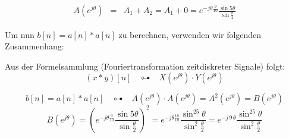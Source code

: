 \begin{uebsp}
\begin{Answer}
\begin{enumerate}[a)]
            \begin{eqnarray*}
                A\left(e^{j\theta}\right)&=&A_1+A_2=A_1+0=e^{-j\theta\frac{9}{10}}\frac{
    \sin5\theta}{\sin\frac{\theta}{2}}
            \end{eqnarray*}

            Um nun $b[n]=a[n]*a[n]$ zu berechnen, verwenden wir folgenden
            Zusammenhang:
            \begin{uebsp_theory}
                Aus der Formelsammlung (Fouriertransformation zeitdiskreter
                Signale) folgt:
                \[(x*y)[n]\;\;\;\multimapdotbothA\;\;\;X\left(e^{j\theta}\right)\cdot
                Y\left(e^{j\theta}\right)\]
            \end{uebsp_theory}
            \[b[n]=a[n]*a[n]\;\;\;\multimapdotbothA\;\;\;A\left(e^{j\theta}\right)\cdot
            A\left(e^{j\theta}\right)=A^2\left(e^{j\theta}\right)=B\left(e^{j\theta}\right)\]
            \[B\left(e^{j\theta}\right)=\left(e^{-j\theta\frac{9}{10}}\frac{
            \sin5\theta}{\sin\frac{\theta}{2}}\right)^2=e^{-j\theta\frac{18}{10}}\frac{
            \sin^25\theta}{\sin^2\frac{\theta}{2}}=e^{-j\,9\,\theta}\frac{
            \sin^25\theta}{\sin^2\frac{\theta}{2}}\]


\end{enumerate}
\end{Answer}
\end{uebsp}
